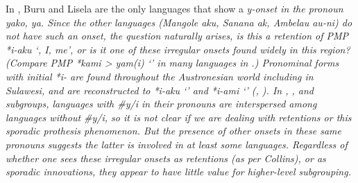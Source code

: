In , Buru and Lisela are the only languages that
show a \it{y}-onset in the  pronoun \it{yako, ya}.
Since the other  languages (Mangole \it{aku},
Sanana \it{ak}, Ambelau \it{au-ni}) do not have such an onset,
the question naturally arises,
is this a retention of PMP *i-aku ‘,
I, me’, or is it one of these irregular onsets found widely in
this region? (Compare PMP *kami > \it{yam(i)} ‘’
in many languages in .) Pronominal forms with initial
*i- are found throughout the Austronesian world including in
Sulawesi, and are reconstructed to  *i-aku ‘’
and *i-ami ‘’ (\citealp{BlustTrussel2020}, \citealp[908]{AdelaarHajek2024}).
In , , and 
subgroups, languages with \it{{\#}y/i} in their pronouns are
interspersed among languages without \it{{\#}y/i},
so it is not clear if we are dealing with retentions or this sporadic prothesis phenomenon.
But the presence of other onsets in these same pronouns suggests
the latter is involved in at least some languages.
Regardless of whether one sees these irregular onsets as retentions
(as per Collins), or as sporadic innovations,
they appear to have little value for higher-level subgrouping.
